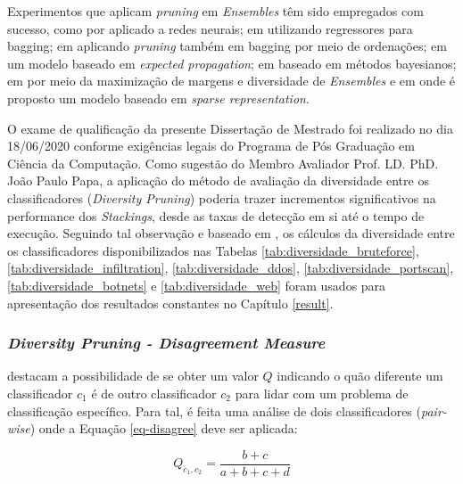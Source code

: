 Experimentos que aplicam\textit{ pruning} em \textit{Ensembles} têm sido empregados com sucesso, como por  aplicado a redes neurais; em  utilizando regressores para bagging; em  aplicando\textit{ pruning} também em bagging por meio de ordenações; em  um modelo baseado em \textit{expected propagation}; em  baseado em métodos bayesianos; em  por meio da maximização de margens e diversidade de \textit{Ensembles} e em  onde é proposto um modelo baseado em \textit{sparse representation}. 

O exame de qualificação da presente Dissertação de Mestrado foi realizado no dia 18/06/2020 conforme exigências legais do Programa de Pós Graduação em Ciência da Computação. Como sugestão do Membro Avaliador Prof. LD. PhD. João Paulo Papa, a aplicação do método de avaliação da diversidade entre os classificadores (\textit{Diversity Pruning}) poderia trazer incrementos significativos na performance dos \textit{Stackings}, desde as taxas de detecção em si até o tempo de execução. Seguindo tal observação e baseado em , os cálculos da diversidade entre os classificadores disponibilizados nas Tabelas \ref{tab:diversidade_bruteforce}, \ref{tab:diversidade_infiltration}, \ref{tab:diversidade_ddos}, \ref{tab:diversidade_portscan}, \ref{tab:diversidade_botnets} e \ref{tab:diversidade_web} foram usados para apresentação dos resultados constantes no Capítulo \ref{result}.


\subsubsection{\textit{Diversity Pruning - Disagreement Measure}}
\label{disagree}


 destacam a possibilidade de se obter um valor $Q$ indicando o quão diferente um classificador $c_1$ é de outro classificador $c_2$ para lidar com um problema de classificação específico. Para tal, é feita uma análise de dois classificadores (\textit{pair-wise}) onde a Equação \ref{eq-disagree} deve ser aplicada: 

\begin{equation}
\label{eq-disagree}
    Q_{c_1,c_2} = \frac{b+c}{a+b+c+d}
\end{equation}

